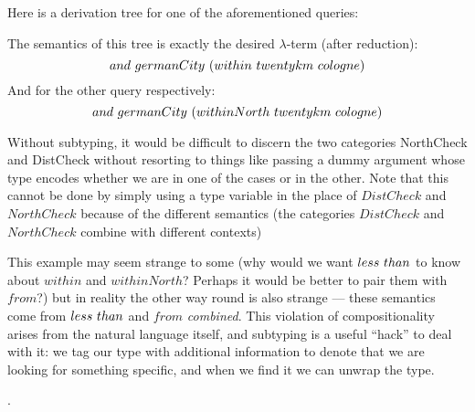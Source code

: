 \documentclass[main.tex]{subfiles}
\begin{document}
\begin{example}
    Here is a derivation tree for one of the aforementioned queries:

    The semantics of this tree is exactly the desired $\lambda$-term (after reduction):
    \[ and \text{ } germanCity \text{ } (within \text{ } twentykm \text{ } cologne) \]
    And for the other query respectively:
    \[ and \text{ } germanCity \text{ } (withinNorth \text{ } twentykm \text{ } cologne) \]

    Without subtyping, it would be difficult to discern the two categories
    NorthCheck and DistCheck without resorting to things like passing a
    dummy argument whose type encodes whether we are in one of the cases or in the other.
    Note that this cannot be done by simply using a type variable in the place
    of $DistCheck$ and $NorthCheck$ because of the different semantics
    (the categories $DistCheck$ and $NorthCheck$
    combine with different contexts)

    This example may seem strange to some (why would
    we want $less \text{ } than$ to know about $within$ and $withinNorth$?
    Perhaps it would be better to pair them with $from$?) but in reality the
    other way round is also strange --- these semantics come from $less \text{ } than$
    and $from$ \emph{combined}. This violation of compositionality arises
    from the natural language itself, and subtyping is a useful ``hack'' to
    deal with it: we tag our type with additional information to denote that
    we are looking for something specific, and when we find it we can unwrap the
    type.
  \end{example}
  .
\end{document}
